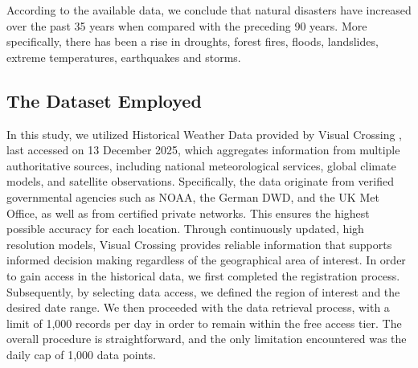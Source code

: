 \documentclass[12pt]{Definitions/academia}
\begin{document}
According to the available data, we conclude that natural disasters
have increased over the past 35 years when compared with the preceding
90 years. More specifically, there has been a rise in droughts, forest
fires, floods, landslides, extreme temperatures, earthquakes and storms.

\clearpage
\subsection{\textmd{The Dataset Employed }}
\vspace{-4em}
In this study, we utilized Historical Weather Data provided by Visual
Crossing \cite{Visual Crossing}, last accessed on
13 December 2025, which aggregates information from multiple authoritative
sources, including national meteorological services, global climate
models, and satellite observations. Specifically, the data originate 
from verified governmental agencies such as NOAA, the German DWD, 
and the UK Met Office, as well as from certified private networks. 
This ensures the highest possible accuracy for each location. 
Through continuously updated, high resolution models,
 Visual Crossing provides reliable information that supports informed 
 decision making regardless of the geographical area of interest.
 In order to gain access in the historical data, we first completed 
 the registration process. Subsequently,
by selecting data access, we defined the region of interest and the
desired date range. We then proceeded with the data retrieval process,
with a limit of 1,000 records per day in order to remain within the
free access tier. The overall procedure is straightforward, and the
only limitation encountered was the daily cap of 1,000 data points.
\end{document}
